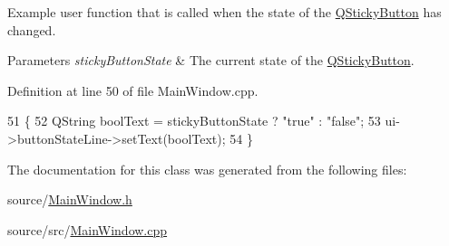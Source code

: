 Example user function that is called when the state of the \hyperlink{class_q_sticky_button}{Q\-Sticky\-Button} has changed. 


\begin{DoxyParams}{Parameters}
{\em sticky\-Button\-State} & The current state of the \hyperlink{class_q_sticky_button}{Q\-Sticky\-Button}. \\
\hline
\end{DoxyParams}


Definition at line 50 of file Main\-Window.\-cpp.


\begin{DoxyCode}
51 \{
52     QString boolText = stickyButtonState ? \textcolor{stringliteral}{"true"} : \textcolor{stringliteral}{"false"};
53     ui->buttonStateLine->setText(boolText);
54 \}
\end{DoxyCode}


The documentation for this class was generated from the following files\-:\begin{DoxyCompactItemize}
\item 
source/\hyperlink{_main_window_8h}{Main\-Window.\-h}\item 
source/src/\hyperlink{_main_window_8cpp}{Main\-Window.\-cpp}\end{DoxyCompactItemize}
